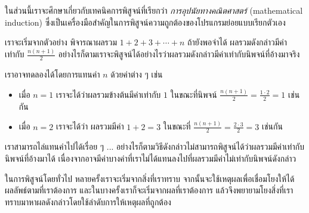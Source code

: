 ใน{\wbr}ส่วน{\wbr}นี้{\wbr}เรา{\wbr}จะ{\wbr}ศึกษา{\wbr}เกี่ยวกับ{\wbr}เทคนิค{\wbr}การ{\wbr}พิสูจน์{\wbr}ที่{\wbr}เรียก{\wbr}ว่า {\em การ{\wbr}อุปนัย{\wbr}ทาง{\wbr}คณิตศาสตร์}
(mathematical induction)
ซึ่ง{\wbr}เป็น{\wbr}เครื่องมือ{\wbr}สำคัญ{\wbr}ใน{\wbr}การ{\wbr}พิสูจน์{\wbr}ความ{\wbr}ถูกต้อง{\wbr}ของ{\wbr}โปรแกรมย่อย{\wbr}แบบ{\wbr}เรียก{\wbr}ตัวเอง{\wbr}

เรา{\wbr}จะ{\wbr}เริ่ม{\wbr}จาก{\wbr}ตัวอย่าง พิจารณา{\wbr}ผลรวม $1+2+3+\cdots+n$ ถ้า{\wbr}ยัง{\wbr}พอ{\wbr}จำ{\wbr}ได้{\wbr}
ผลรวม{\wbr}ดังกล่าว{\wbr}มี{\wbr}ค่า{\wbr}เท่า{\wbr}กับ $\frac{n(n+1)}{2}$
อย่างไรก็ตาม{\wbr}เรา{\wbr}จะ{\wbr}พิสูจน์{\wbr}ได้{\wbr}อย่างไร{\wbr}ว่า{\wbr}ผลรวม{\wbr}ดังกล่าว{\wbr}มี{\wbr}ค่า{\wbr}เท่า{\wbr}กับ{\wbr}นิพจน์{\wbr}ที่{\wbr}อ้าง{\wbr}มา{\wbr}จริง{\wbr}

เรา{\wbr}อาจ{\wbr}ทดลอง{\wbr}ได้{\wbr}โดย{\wbr}การ{\wbr}แทน{\wbr}ค่า $ n $ ด้วย{\wbr}ค่า{\wbr}ต่าง ๆ เช่น{\wbr}

\begin{itemize}
\item เมื่อ $ n=1 $ เรา{\wbr}จะ{\wbr}ได้{\wbr}ว่า{\wbr}ผลรวม{\wbr}ข้างต้น{\wbr}มี{\wbr}ค่า{\wbr}เท่า{\wbr}กับ $ 1 $ ใน{\wbr}ขณะที่{\wbr}นิพจน์ $
  \frac{n(n+1)}{2}=\frac{1\cdot 2}{2}=1 $ เช่นกัน{\wbr}
\item เมื่อ $ n=2 $ เรา{\wbr}จะ{\wbr}ได้{\wbr}ว่า ผลรวม{\wbr}มี{\wbr}ค่า $ 1+2=3 $ ใน{\wbr}ขณะที่ $
  \frac{n(n+1)}{2}=\frac{2\cdot 3}{2}=3 $ เช่นกัน{\wbr}
\end{itemize}

เรา{\wbr}สามารถ{\wbr}ไล่{\wbr}แทน{\wbr}ค่า{\wbr}ไป{\wbr}ได้{\wbr}เรื่อย ๆ
... อย่างไรก็ตาม{\wbr}วิธี{\wbr}ดังกล่าว{\wbr}ไม่{\wbr}สามารถ{\wbr}พิสูจน์{\wbr}ได้{\wbr}ว่า{\wbr}ผลรวม{\wbr}มี{\wbr}ค่า{\wbr}เท่า{\wbr}กับ{\wbr}นิพจน์{\wbr}ที่{\wbr}อ้าง{\wbr}มา{\wbr}ได้{\wbr}
เนื่องจาก{\wbr}อาจ{\wbr}มี{\wbr}ค่า{\wbr}บาง{\wbr}ค่า{\wbr}ที่{\wbr}เรา{\wbr}ไม่{\wbr}ได้{\wbr}แทน{\wbr}ลง{\wbr}ไป{\wbr}ที่{\wbr}ผลรวม{\wbr}มี{\wbr}ค่า{\wbr}ไม่{\wbr}เท่า{\wbr}กับ{\wbr}นิพจน์{\wbr}ดังกล่าว{\wbr}

ใน{\wbr}การ{\wbr}พิสูจน์{\wbr}โดย{\wbr}ทั่วไป หลาย{\wbr}ครั้ง{\wbr}เรา{\wbr}จะ{\wbr}เริ่ม{\wbr}จาก{\wbr}สิ่ง{\wbr}ที่{\wbr}เรา{\wbr}ทราบ{\wbr}
จากนั้น{\wbr}จะ{\wbr}ใช้{\wbr}เหตุผล{\wbr}เพื่อ{\wbr}เชื่อมโยง{\wbr}ให้{\wbr}ได้{\wbr}ผลลัพธ์{\wbr}ตาม{\wbr}ที่{\wbr}เรา{\wbr}ต้องการ{\wbr}
และ{\wbr}ใน{\wbr}บาง{\wbr}ครั้ง{\wbr}เรา{\wbr}ก็{\wbr}จะ{\wbr}เริ่ม{\wbr}จาก{\wbr}ผล{\wbr}ที่{\wbr}เรา{\wbr}ต้องการ{\wbr}
แล้ว{\wbr}จึง{\wbr}พยายาม{\wbr}โยง{\wbr}สิ่ง{\wbr}ที่{\wbr}เรา{\wbr}ทราบ{\wbr}มา{\wbr}หา{\wbr}ผล{\wbr}ดังกล่าว{\wbr}โดย{\wbr}ใช้{\wbr}ลำดับ{\wbr}การ{\wbr}ให้{\wbr}เหตุผล{\wbr}ที่{\wbr}ถูกต้อง{\wbr}

